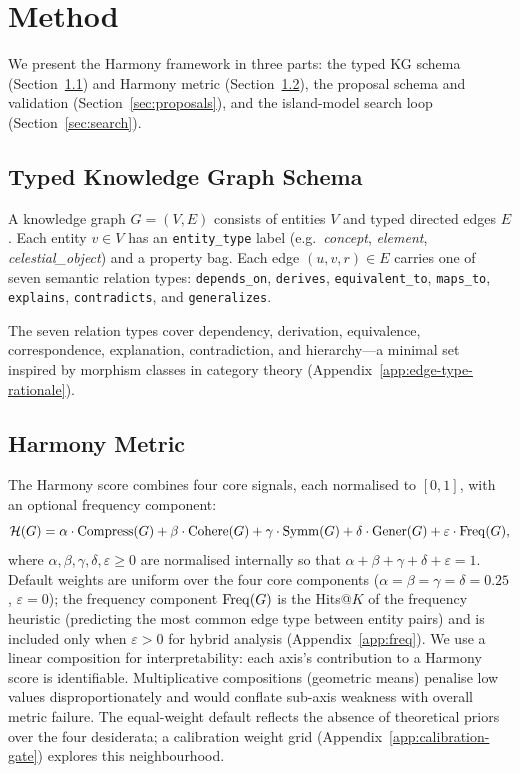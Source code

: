 \section{Method}\label{sec:method}

We present the Harmony framework in three parts: the typed KG schema
(Section~\ref{sec:schema}) and Harmony metric (Section~\ref{sec:metric}), the
proposal schema and validation (Section~\ref{sec:proposals}), and the
island-model search loop (Section~\ref{sec:search}).

\subsection{Typed Knowledge Graph Schema}\label{sec:schema}

A knowledge graph $G = (V, E)$ consists of entities $V$ and typed directed edges
$E$.  Each entity $v \in V$ has an \texttt{entity\_type} label (e.g.\
\emph{concept}, \emph{element}, \emph{celestial\_object}) and a property bag.
Each edge $(u, v, r) \in E$ carries one of seven semantic relation types:
\texttt{depends\_on}, \texttt{derives}, \texttt{equivalent\_to},
\texttt{maps\_to}, \texttt{explains}, \texttt{contradicts}, and
\texttt{generalizes}.

The seven relation types cover dependency, derivation, equivalence,
correspondence, explanation, contradiction, and hierarchy---a minimal set
inspired by morphism classes in category theory
(Appendix~\ref{app:edge-type-rationale}).

\subsection{Harmony Metric}\label{sec:metric}

The Harmony score combines four core signals, each normalised to $[0,1]$,
with an optional frequency component:
\begin{equation}\label{eq:harmony}
  \mathcal{H}(G)
  = \alpha \cdot \operatorname{Compress}(G)
  + \beta  \cdot \operatorname{Cohere}(G)
  + \gamma \cdot \operatorname{Symm}(G)
  + \delta \cdot \operatorname{Gener}(G)
  + \varepsilon \cdot \operatorname{Freq}(G),
\end{equation}
where $\alpha, \beta, \gamma, \delta, \varepsilon \geq 0$ are normalised
internally so that $\alpha + \beta + \gamma + \delta + \varepsilon = 1$.
Default weights are uniform over the four core components
($\alpha = \beta = \gamma = \delta = 0.25$, $\varepsilon = 0$); the
frequency component $\operatorname{Freq}(G)$ is the Hits@$K$ of the frequency heuristic
(predicting the most common edge type between entity pairs) and is included
only when $\varepsilon > 0$ for hybrid analysis (Appendix~\ref{app:freq}).
We use a linear composition for interpretability: each axis's contribution
to a Harmony score is identifiable.  Multiplicative compositions
(geometric means) penalise low values disproportionately and would
conflate sub-axis weakness with overall metric failure.  The equal-weight
default reflects the absence of theoretical priors over the four
desiderata; a calibration weight grid (Appendix~\ref{app:calibration-gate})
explores this neighbourhood.

